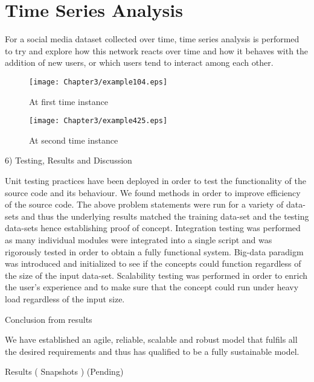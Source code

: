 \section{Time Series Analysis}

For a social media dataset collected over time, time series analysis is performed to try and explore how this network reacts over time and how it behaves with the addition of new users, or which users tend to interact among each other. 

\begin{figure}[hb]
\centering
\begin{minipage}{0.45\linewidth}
\texttt{[image: Chapter3/example104.eps]}
\caption{At first time instance}
\end{minipage}
\quad
\begin{minipage}{0.45\linewidth}
\texttt{[image: Chapter3/example425.eps]}
\caption{At second time instance}
\end{minipage}
\end{figure}


6)  Testing, Results and Discussion

Unit testing practices have been deployed in order to test the functionality of the source code and its behaviour. We found methods in order to improve efficiency of the source code. The above problem statements were run for a variety of data-sets and thus the underlying results matched the training data-set and the testing data-sets hence establishing proof of concept. Integration testing was performed as many individual modules were integrated into a single script and was rigorously tested in order to obtain a fully functional system. Big-data paradigm was introduced and initialized to see if the concepts could function regardless of the size of the input data-set. Scalability testing was performed in order to enrich the user’s experience and to make sure that the concept could run under heavy load regardless of the input size.

Conclusion from results

We have established an agile, reliable, scalable and robust model that fulfils all the desired requirements and thus has qualified to be a fully sustainable model.

Results ( Snapshots ) (Pending)



